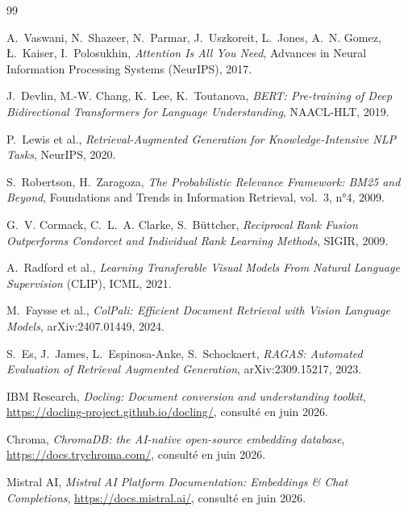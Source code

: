 \cleardoublepage
{}
{}
\begin{thebibliography}{99}

A.~Vaswani, N.~Shazeer, N.~Parmar, J.~Uszkoreit, L.~Jones, A.~N. Gomez, Ł.~Kaiser,
I.~Polosukhin, \emph{Attention Is All You Need}, Advances in Neural Information Processing
Systems (NeurIPS), 2017.

J.~Devlin, M.-W. Chang, K.~Lee, K.~Toutanova, \emph{BERT: Pre-training of Deep
Bidirectional Transformers for Language Understanding}, NAACL-HLT, 2019.

P.~Lewis et al., \emph{Retrieval-Augmented Generation for Knowledge-Intensive NLP Tasks},
NeurIPS, 2020.

S.~Robertson, H.~Zaragoza, \emph{The Probabilistic Relevance Framework: BM25 and Beyond},
Foundations and Trends in Information Retrieval, vol.~3, n°4, 2009.

G.~V. Cormack, C.~L.~A. Clarke, S.~Büttcher, \emph{Reciprocal Rank Fusion Outperforms
Condorcet and Individual Rank Learning Methods}, SIGIR, 2009.

A.~Radford et al., \emph{Learning Transferable Visual Models From Natural Language
Supervision} (CLIP), ICML, 2021.

M.~Faysse et al., \emph{ColPali: Efficient Document Retrieval with Vision Language
Models}, arXiv:2407.01449, 2024.

S.~Es, J.~James, L.~Espinosa-Anke, S.~Schockaert, \emph{RAGAS: Automated Evaluation of
Retrieval Augmented Generation}, arXiv:2309.15217, 2023.

IBM Research, \emph{Docling: Document conversion and understanding toolkit},
\url{https://docling-project.github.io/docling/}, consulté en juin 2026.

Chroma, \emph{ChromaDB: the AI-native open-source embedding database},
\url{https://docs.trychroma.com/}, consulté en juin 2026.

Mistral AI, \emph{Mistral AI Platform Documentation: Embeddings \& Chat Completions},
\url{https://docs.mistral.ai/}, consulté en juin 2026.


\end{thebibliography}
